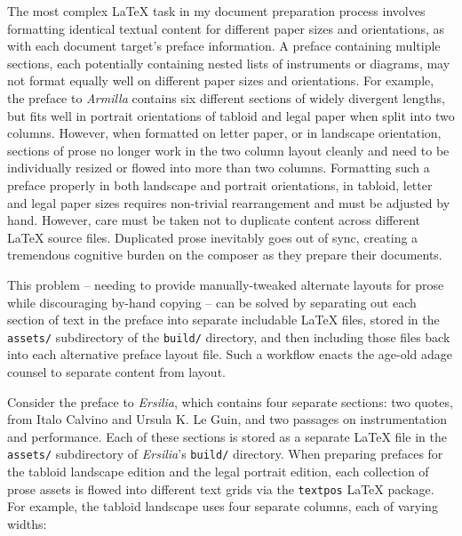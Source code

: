 The most complex LaTeX task in my document preparation process involves
formatting identical textual content for different paper sizes and
orientations, as with each document target's preface information. A preface
containing multiple sections, each potentially containing nested lists of
instruments or diagrams, may not format equally well on different paper sizes
and orientations. For example, the preface to \emph{Armilla} contains six
different sections of widely divergent lengths, but fits well in portrait
orientations of tabloid and legal paper when split into two columns. However,
when formatted on letter paper, or in landscape orientation, sections of prose
no longer work in the two column layout cleanly and need to be individually
resized or flowed into more than two columns. Formatting such a preface
properly in both landscape and portrait orientations, in tabloid, letter and
legal paper sizes requires non-trivial rearrangement and must be adjusted by
hand. However, care must be taken not to duplicate content across different
LaTeX source files. Duplicated prose inevitably goes out of sync, creating a
tremendous cognitive burden on the composer as they prepare their documents.

This problem -- needing to provide manually-tweaked alternate layouts for prose
while discouraging by-hand copying -- can be solved by separating out each
section of text in the preface into separate includable LaTeX files, stored in
the \texttt{assets/} subdirectory of the \texttt{build/} directory, and then
including those files back into each alternative preface layout file. Such a
workflow enacts the age-old adage counsel to separate content from layout.

Consider the preface to \emph{Ersilia}, which contains four separate sections:
two quotes, from Italo Calvino and Ursula K. Le Guin, and two passages on
instrumentation and performance. Each of these sections is stored as a separate
LaTeX file in the \texttt{assets/} subdirectory of \emph{Ersilia}'s
\texttt{build/} directory. When preparing prefaces for the tabloid landscape
edition and the legal portrait edition, each collection of prose assets is
flowed into different text grids via the \texttt{textpos} LaTeX package. For
example, the tabloid landscape uses four separate columns, each of varying
widths:


